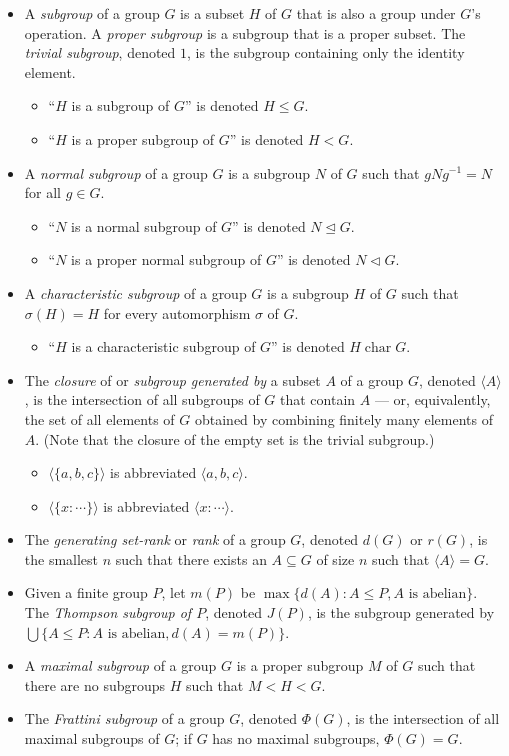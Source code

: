 \documentclass{article}
\newcommand{\Char}{\mathrel{\operatorname{char}}}
\newcommand{\gen}[1]{\langle #1\rangle}
\newcommand{\normaleq}{\trianglelefteq}
\newcommand{\normal}{\triangleleft}
\begin{document}
\begin{itemize}
\item A \emph{subgroup} of a group $G$ is a subset $H$ of $G$ that is also a group under $G$'s operation.  A \emph{proper subgroup} is a subgroup that is a proper subset.  The \emph{trivial subgroup}, denoted $1$, is the subgroup containing only the identity element.
 \begin{itemize}
 \item ``$H$ is a subgroup of $G$'' is denoted $H\leq G$.
 \item ``$H$ is a proper subgroup of $G$'' is denoted $H<G$.
 \end{itemize}
\item A \emph{normal subgroup} of a group $G$ is a subgroup $N$ of $G$ such that $gNg^{-1} = N$ for all $g\in G$.
 \begin{itemize}
 \item ``$N$ is a normal subgroup of $G$'' is denoted $N\normaleq G$.
 \item ``$N$ is a proper normal subgroup of $G$'' is denoted $N\normal G$.
 \end{itemize}
\item A \emph{characteristic subgroup} of a group $G$ is a subgroup $H$ of $G$ such that $\sigma(H) = H$ for every automorphism $\sigma$ of $G$.
 \begin{itemize}
 \item ``$H$ is a characteristic subgroup of $G$'' is denoted $H\Char G$.
 \end{itemize}
\item The \emph{closure} of or \emph{subgroup generated by} a subset $A$ of a group $G$, denoted $\gen{A}$, is the intersection of all subgroups of $G$ that contain $A$ --- or, equivalently, the set of all elements of $G$ obtained by combining finitely many elements of $A$.  (Note that the closure of the empty set is the trivial subgroup.)
 \begin{itemize}
 \item $\gen{\{a,b,c\}}$ is abbreviated $\gen{a,b,c}$.
 \item $\gen{\{x : \cdots\}}$ is abbreviated $\gen{x : \cdots}$.
 \end{itemize}
\item The \emph{generating set-rank} or \emph{rank} of a group $G$, denoted $d(G)$ or $r(G)$, is the smallest $n$ such that there exists an $A\subseteq G$ of size $n$ such that $\gen{A} = G$.
\item Given a finite group $P$, let $m(P)$ be $\max\{d(A) : A\leq P, A\mbox{ is abelian}\}$.  The \emph{Thompson subgroup of $P$}, denoted $J(P)$, is the subgroup generated by $\bigcup\{A\leq P : A\mbox{ is abelian}, d(A) = m(P)\}$.
\item A \emph{maximal subgroup} of a group $G$ is a proper subgroup $M$ of $G$ such that there are no subgroups $H$ such that $M<H<G$.
\item The \emph{Frattini subgroup} of a group $G$, denoted $\Phi(G)$, is the intersection of all maximal subgroups of $G$; if $G$ has no maximal subgroups, $\Phi(G) = G$.


\end{itemize}
\end{document}
